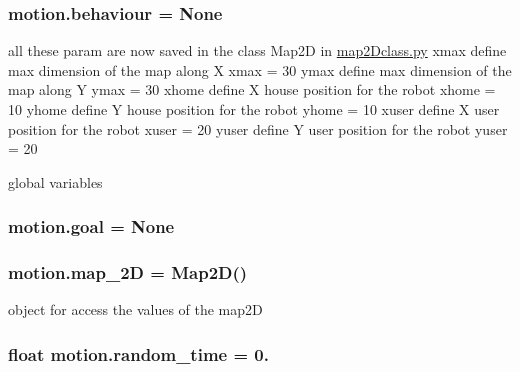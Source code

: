 \subsubsection[{\texorpdfstring{behaviour}{behaviour}}]{\setlength{\rightskip}{0pt plus 5cm}motion.\+behaviour = None}\hypertarget{namespacemotion_a15d63b2a70ac940f179085ce72871c86}{}\label{namespacemotion_a15d63b2a70ac940f179085ce72871c86}


all these param are now saved in the class Map2D in \hyperlink{map2Dclass_8py}{map2\+Dclass.\+py} xmax define max dimension of the map along X xmax = 30 ymax define max dimension of the map along Y ymax = 30 xhome define X house position for the robot xhome = 10 yhome define Y house position for the robot yhome = 10 xuser define X user position for the robot xuser = 20 yuser define Y user position for the robot yuser = 20 

global variables 
\subsubsection[{\texorpdfstring{goal}{goal}}]{\setlength{\rightskip}{0pt plus 5cm}motion.\+goal = None}\hypertarget{namespacemotion_a6427953689c120f9b8a1cb3646733b85}{}\label{namespacemotion_a6427953689c120f9b8a1cb3646733b85}
\subsubsection[{\texorpdfstring{map\+\_\+2D}{map_2D}}]{\setlength{\rightskip}{0pt plus 5cm}motion.\+map\+\_\+2D = {\bf Map2D}()}\hypertarget{namespacemotion_a858c2a633daaa0a83b599397041f524b}{}\label{namespacemotion_a858c2a633daaa0a83b599397041f524b}


object for access the values of the map2D 

\subsubsection[{\texorpdfstring{random\+\_\+time}{random_time}}]{\setlength{\rightskip}{0pt plus 5cm}float motion.\+random\+\_\+time = 0.}\hypertarget{namespacemotion_a577a5f71c1bdf849f48eed17c4134bee}{}\label{namespacemotion_a577a5f71c1bdf849f48eed17c4134bee}

